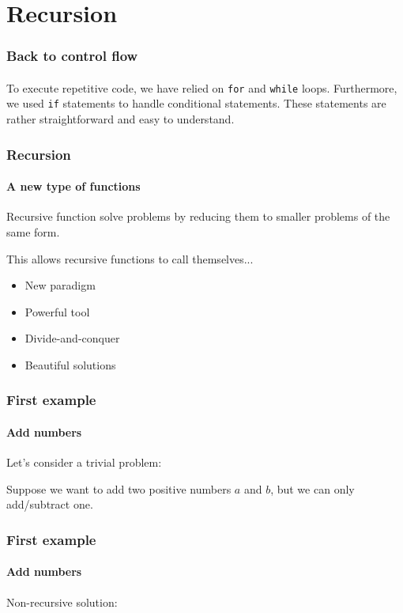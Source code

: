 \section{Recursion} %
\label{sec:recursion}


\begin{frame}\frametitle{Back to control flow}
    \framesubtitle{}

    To execute repetitive code, we have relied on \texttt{for} and \texttt{while}
    loops.
    \vfill
    Furthermore, we used \texttt{if} statements to handle conditional statements.
    \vfill
    These statements are rather straightforward and easy to understand.

\end{frame}

\begin{frame}\frametitle{Recursion}
    \framesubtitle{A new type of functions}

    Recursive function solve problems by reducing them to smaller problems
    of the same form.

    \vfill

    This allows recursive functions to call themselves...

    \pause\vfill

    \begin{itemize}
        \item New paradigm
        \item Powerful tool
        \item Divide-and-conquer
        \item Beautiful solutions
    \end{itemize}

\end{frame}

\begin{frame}\frametitle{First example}
    \framesubtitle{Add numbers}

    Let's consider a trivial problem:

    Suppose we want to add two positive numbers $a$ and $b$, but we can only add/subtract one.

\end{frame}

\begin{frame}\frametitle{First example}
    \framesubtitle{Add numbers}

    Non-recursive solution:

\end{frame}

